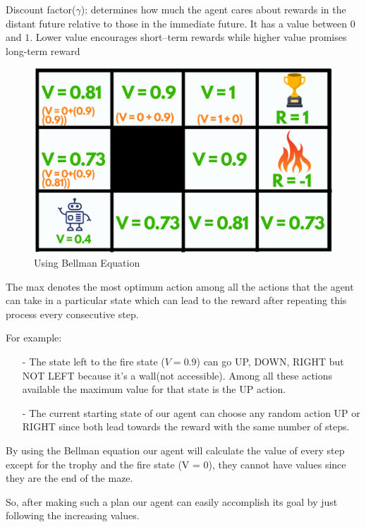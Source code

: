 Discount factor($\gamma$): determines how much the agent cares about rewards 
in the distant future relative to those in the immediate future. It has a value 
between $0$ and $1$. Lower value encourages short–term rewards while higher 
value promises long-term reward

\begin{figure}[H]
\centering
\includegraphics[scale=0.3]{pix/maze_bellman.png}
\caption{Using Bellman Equation}
\end{figure}

The max denotes the most optimum action among all the actions that the agent can 
take in a particular state which can lead to the reward after repeating this 
process every consecutive step.  

For example:

\begin{itemize}
\setlength{\parskip}{0pt}
\item[-]
The state left to the fire state ($V = 0.9$) can go UP, DOWN, RIGHT but NOT LEFT 
because it's a wall(not accessible). Among all these actions available the maximum 
value for that state is the UP action.

\item[-]
The current starting state of our agent can choose any random action UP or RIGHT 
since both lead towards the reward with the same number of steps.
\end{itemize}

By using the Bellman equation our agent will calculate the value of every step 
except for the trophy and the fire state (V = 0), they cannot have values since 
they are the end of the maze.

So, after making such a plan our agent can easily accomplish its goal by just 
following the increasing values.


